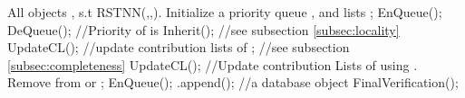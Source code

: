 \documentclass[prodmode,letterpaper]{acmsmall}
\newcommand{\rstknn}{RSTNN\xspace}
\begin{document}
\begin{spacing}{0.8}
\begin{algorithm}[tp]
\caption{\rstknn(: IUR-Tree root,: query) from \protect\cite{lu2011reverse}}
\begin{algorithmic}[1]
 All objects , s.t  \rstknn(,,).
\State Initialize a priority queue , and lists ;
\State EnQueue();
	\State  DeQueue(); //Priority of  is 
		\State Inherit();
			 //see subsection \ref{subsec:locality}
			\State UpdateCL(); //update contribution lists of ;
			 //see subsection \ref{subsec:completeness}
			\EndIf
			\If{}
				\State UpdateCL(); //Update contribution Lists of  using .
					\State Remove  from  or ;
				\EndIf
			\EndIf
					\State EnQueue();
				\Else
					\State .append(); //a database object
				\EndIf
			\EndIf
			\EndFor
		\EndIf
	\EndFor
\EndWhile
\State FinalVerification();
\end{algorithmic}
\end{algorithm}
\end{spacing}
\end{document}

